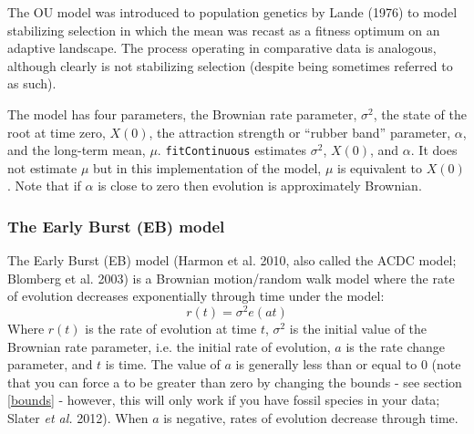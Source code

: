 \documentclass[11pt]{article}
\begin{document}
The OU model was introduced to population genetics by Lande (1976) to model stabilizing selection in which the mean was recast as a fitness optimum on an adaptive landscape. The process operating in comparative data is analogous, although clearly is not stabilizing selection (despite being sometimes referred to as such). 



The model has four parameters, the Brownian rate parameter, $\sigma^2$, the state of the root at time zero, $X(0)$, the attraction strength or ``rubber band'' parameter, $\alpha$, and the long-term mean, $\mu$. \texttt{fitContinuous} estimates $\sigma^2$, $X(0)$, and $\alpha$. It does not estimate $\mu$ but in this implementation of the model, $\mu$ is equivalent to $X(0)$. Note that if $\alpha$ is close to zero then evolution is approximately Brownian.

\subsubsection{The Early Burst (EB) model}

The Early Burst (EB) model (Harmon et al. 2010, also called the ACDC model; Blomberg et al. 2003) is a Brownian motion/random walk model where the rate of evolution decreases exponentially through time under the model:
\begin{equation}
r(t) = \sigma^2e(at)
\end{equation}
Where $r(t)$ is the rate of evolution at time $t$, $\sigma^2$ is the initial value of the Brownian rate parameter, i.e. the initial rate of evolution, $a$ is the rate change parameter, and $t$ is time. The value of $a$ is generally less than or equal to 0 (note that you can force a to be greater than zero by changing the bounds - see section \ref{bounds} - however, this will only work if you have fossil species in your data; Slater \textit{et al.} 2012). When $a$ is negative, rates of evolution decrease through time.
\end{document}
